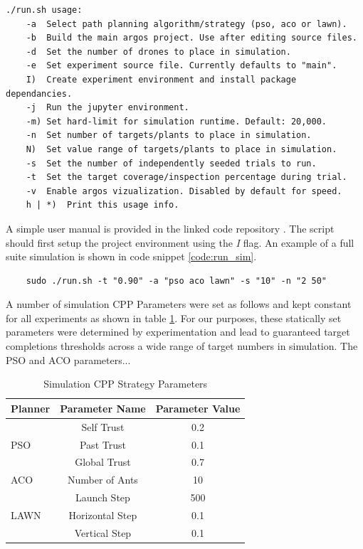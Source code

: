 \documentclass{report}
\newenvironment{code}{\captionsetup{type=listing}}{}
\begin{document}
\begin{code}
\begin{verbatim}
./run.sh usage:
	-a  Select path planning algorithm/strategy (pso, aco or lawn).
	-b  Build the main argos project. Use after editing source files.
	-d  Set the number of drones to place in simulation.
	-e  Set experiment source file. Currently defaults to "main".
	I)  Create experiment environment and install package dependancies.
	-j  Run the jupyter environment.
	-m) Set hard-limit for simulation runtime. Default: 20,000.
	-n  Set number of targets/plants to place in simulation.
	N)  Set value range of targets/plants to place in simulation.
	-s  Set the number of independently seeded trials to run.
	-t  Set the target coverage/inspection percentage during trial.
	-v  Enable argos vizualization. Disabled by default for speed.
	h | *)  Print this usage info.
\end{verbatim}
\label{code:script_help}
\end{code}
\vspace{1cm}

A simple user manual is provided in the linked code repository \cite{SWARMCODE}. The script should first setup the project environment using the \textit{I} flag. An example of a full suite simulation is shown in code snippet \ref{code:run_sim}.

\begin{code}
\begin{verbatim}
	sudo ./run.sh -t "0.90" -a "pso aco lawn" -s "10" -n "2 50"
\end{verbatim}
\label{code:run_sim}
\end{code}
\vspace{1cm}

A number of simulation CPP Parameters were set as follows and kept constant for all experiments as shown in table \ref{tab:sim_cpp_params}. For our purposes, these statically set parameters were determined by experimentation and lead to guaranteed target completions thresholds across a wide range of target numbers in simulation. The PSO and ACO parameters...

\bgroup
\def\arraystretch{1.5}%
\begin{table}[h]
  \centering
  \begin{tabular}{|l|c|c|}
  \hline
  \textbf{Planner} & \textbf{Parameter Name} & \textbf{Parameter Value} \\
  \hline
  \multirow{3}{*}{PSO} & Self Trust & 0.2 \\
	& Past Trust & 0.1 \\
	& Global Trust & 0.7 \\
  \hline
  ACO & Number of Ants & 10 \\
  \hline
  \multirow{3}{*}{LAWN} & Launch Step & 500 \\
	& Horizontal Step & 0.1 \\
	& Vertical Step & 0.1 \\
  \hline
  \end{tabular}
  \caption{Simulation CPP Strategy Parameters}
  \label{tab:sim_cpp_params}
\end{table}
\egroup
\end{document}
